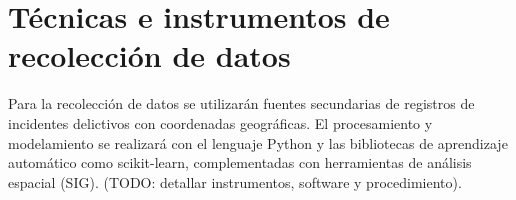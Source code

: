 
\section{Técnicas e instrumentos de recolección de datos}

\label{sec:tecnicas}

Para la recolección de datos se utilizarán fuentes secundarias de
registros de incidentes delictivos con coordenadas geográficas. El
procesamiento y modelamiento se realizará con el lenguaje Python y
las bibliotecas de aprendizaje automático como scikit-learn, complementadas
con herramientas de análisis espacial (SIG). (TODO: detallar instrumentos,
software y procedimiento).
